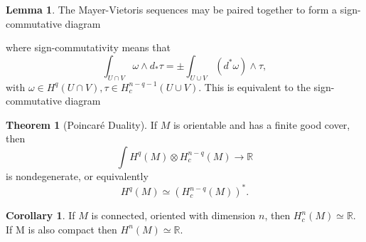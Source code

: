 \documentclass[twocolumn]{article}
\theoremstyle{definition}
\newtheorem{theorem}[definition]{Theorem}
\newtheorem{lemma}[definition]{Lemma}
\newtheorem{corollary}[definition]{Corollary}
\theoremstyle{remark}
\begin{document}
\begin{lemma}
    The Mayer-Vietoris sequences may be paired together to form a sign-commutative diagram
    \begin{center}
    \end{center}
    where sign-commutativity means that
    \begin{equation}
        \int_{U\cap V} \omega\wedge d_* \tau = \pm \int_{U \cup V}(d^*\omega)\wedge \tau,
    \end{equation}
    with $\omega \in H^q(U\cap V), \tau \in H_c^{n-q-1}(U\cup V)$.
    This is equivalent to the sign-commutative diagram
    \begin{center}
    \end{center}
\end{lemma}
\begin{theorem}[Poincaré Duality]
    If $M$ is orientable and has a finite good cover, then
    \begin{equation}
        \int H^q(M) \otimes H_c^{n-q}(M) \rightarrow \mathbb{R}
    \end{equation}
    is nondegenerate, or equivalently
    \begin{equation}
        H^q(M) \simeq (H_c^{n-q}(M))^*.
    \end{equation}
\end{theorem}
\begin{corollary}
    If $M$ is connected, oriented with dimension $n$, then $H^n_c(M) \simeq \mathbb{R}$.
    If M is also compact then $H^n(M) \simeq \mathbb{R}$.
\end{corollary}
\end{document}
